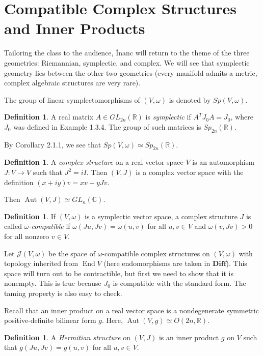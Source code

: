 \documentclass[leqno, openany]{memoir}
\theoremstyle{definition}
\newtheorem{defn}[thm]{Definition}
\theoremstyle{remark}
\theoremstyle{plain}
\theoremstyle{definition}
\theoremstyle{remark}
\newcommand{\R}{\mathbb{R}}
\newcommand{\C}{\mathbb{C}}
\newcommand{\mc}[1]{\mathcal{#1}}
\DeclareMathOperator{\End}{End}
\DeclareMathOperator{\Aut}{Aut}
\begin{document}
\section{Compatible Complex Structures and Inner Products}%
\label{sec:compatible_complex_structures_and_inner_products}

Tailoring the class to the audience, \.Inanc will return to the theme of the three geometries: Riemannian, symplectic, and complex. We will see that symplectic geometry lies between the other two geometries (every manifold admits a metric, complex algebraic structures are very rare).

The group of linear symplectomorphisms of $(V, \omega)$ is denoted by $Sp(V, \omega)$.
\begin{defn}
    A real matrix $A \in GL_{2n}(\R)$ is \textit{symplectic} if $A^T J_0 A = J_0$, where $J_0$ was defined in Example 1.3.4. The group of such matrices is $Sp_{2n}(\R)$.
\end{defn}

By Corollary 2.1.1, we see that $Sp(V, \omega) \simeq Sp_{2n}(\R)$.

\begin{defn}
    A \textit{complex structure} on a real vector space $V$ is an automorphism $J: V \to V$ such that $J^2 = iI$. Then $(V, J)$ is a complex vector space with the definition $(x+iy) v = x v + yJv$.
\end{defn}
Then $\Aut(V, J) \simeq GL_n(\C)$.

\begin{defn}
    If $(V, \omega)$ is a symplectic vector space, a complex structure $J$ is called \textit{$\omega$-compatible} if $\omega(Ju, Jv) = \omega(u,v)$ for all $u,v \in V$ and $\omega(v, Jv) > 0$ for all nonzero $v \in V$.
\end{defn}
Let $\mc{J}(V, \omega)$ be the space of $\omega$-compatible complex structures on $(V, \omega)$ with topology inherited from $\End V$ (here endomorphisms are taken in $\mathbf{Diff}$). This space will turn out to be contractible, but first we need to show that it is nonempty. This is true because $J_0$ is compatible with the standard form. The taming property is also easy to check.

Recall that an inner product on a real vector space is a nondegenerate symmetric positive-definite bilinear form $g$. Here, $\Aut(V,g) \simeq O(2n, \R)$.
\begin{defn}
    A \textit{Hermitian structure} on $(V,J)$ is an inner product $g$ on $V$ such that $g(Ju, Jv) = g(u, v)$ for all $u,v \in V$.
\end{defn}
\end{document}
